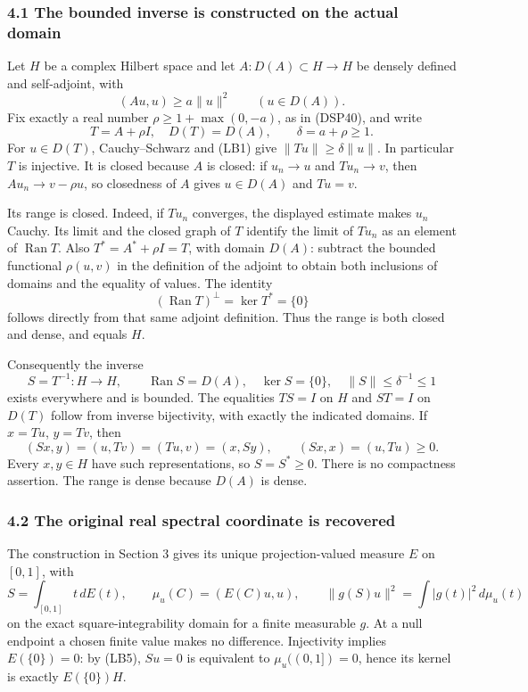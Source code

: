\documentclass[
  11pt,
]{article}
\begin{document}
\subsubsection{4.1 The bounded inverse is constructed on the actual
domain}\label{the-bounded-inverse-is-constructed-on-the-actual-domain}

Let \(H\) be a complex Hilbert space and let \(A:D(A)\subset H\to H\) be
densely defined and self-adjoint, with \[
 (Au,u)\geq a\|u\|^2\qquad(u\in D(A)).
 \tag{LB1}
\] Fix exactly a real number \(\rho\geq1+\max(0,-a)\), as in (DSP40),
and write \[
 T=A+\rho I,\quad D(T)=D(A),\qquad
 \delta=a+\rho\geq1.
 \tag{LB2}
\] For \(u\in D(T)\), Cauchy--Schwarz and (LB1) give
\(\|Tu\|\geq\delta\|u\|\). In particular \(T\) is injective. It is
closed because \(A\) is closed: if \(u_n\to u\) and \(Tu_n\to v\), then
\(Au_n\to v-\rho u\), so closedness of \(A\) gives \(u\in D(A)\) and
\(Tu=v\).

Its range is closed. Indeed, if \(Tu_n\) converges, the displayed
estimate makes \(u_n\) Cauchy. Its limit and the closed graph of \(T\)
identify the limit of \(Tu_n\) as an element of \(\operatorname{Ran}T\).
Also \(T^*=A^*+\rho I=T\), with domain \(D(A)\): subtract the bounded
functional \(\rho(u,v)\) in the definition of the adjoint to obtain both
inclusions of domains and the equality of values. The identity \[
 (\operatorname{Ran}T)^\perp=\ker T^*=\{0\}
\] follows directly from that same adjoint definition. Thus the range is
both closed and dense, and equals \(H\).

Consequently the inverse \[
 S=T^{-1}:H\longrightarrow H,\qquad
 \operatorname{Ran}S=D(A),\quad \ker S=\{0\},\quad
 \|S\|\leq\delta^{-1}\leq1
 \tag{LB3}
\] exists everywhere and is bounded. The equalities \(TS=I\) on \(H\)
and \(ST=I\) on \(D(T)\) follow from inverse bijectivity, with exactly
the indicated domains. If \(x=Tu\), \(y=Tv\), then \[
 (Sx,y)=(u,Tv)=(Tu,v)=(x,Sy),
 \qquad (Sx,x)=(u,Tu)\geq0.
 \tag{LB4}
\] Every \(x,y\in H\) have such representations, so \(S=S^*\geq0\).
There is no compactness assertion. The range is dense because \(D(A)\)
is dense.

\subsubsection{4.2 The original real spectral coordinate is
recovered}\label{the-original-real-spectral-coordinate-is-recovered}

The construction in Section 3 gives its unique projection-valued measure
\(E\) on \([0,1]\), with \[
 S=\int_{[0,1]}t\,dE(t),\qquad
 \mu_u(C)=(E(C)u,u),\qquad
 \|g(S)u\|^2=\int |g(t)|^2\,d\mu_u(t)
 \tag{LB5}
\] on the exact square-integrability domain for a finite measurable
\(g\). At a null endpoint a chosen finite value makes no difference.
Injectivity implies \(E(\{0\})=0\): by (LB5), \(Su=0\) is equivalent to
\(\mu_u((0,1])=0\), hence its kernel is exactly \(E(\{0\})H\).
\end{document}
